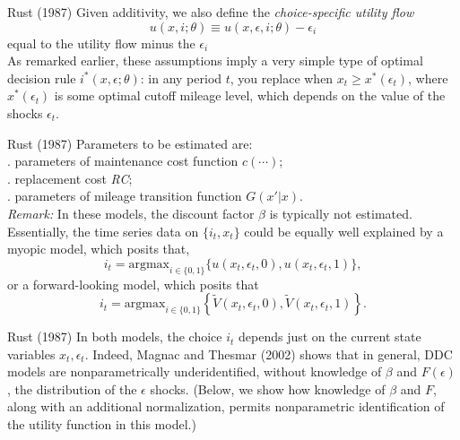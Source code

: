 \documentclass[xcolor=pdftex,dvipsnames,table,mathserif]{beamer}
\begin{document}
\begin{frame}{Rust (1987)}
Given additivity, we also define the \emph{choice-specific utility flow}
\begin{equation*}
u(x, i;\theta) \equiv u(x, \epsilon, i; \theta) - \epsilon_i
\end{equation*}
equal to the utility flow minus the $\epsilon_i$\\
\vspace{3mm}
As remarked earlier, these assumptions imply a very simple type of optimal decision rule $i^* (x, \epsilon;\theta)$: in any period $t$, you replace when $x_t \geq x^*(\epsilon_t)$, where $x^*(\epsilon_t)$ is some optimal cutoff mileage level, which depends on the value of the shocks $\epsilon_t$. 
\end{frame}

\begin{frame}{Rust (1987)}
Parameters to be estimated are: \\
\vspace{3mm}
. parameters of maintenance cost function $c(\cdots)$; \\
\vspace{2mm}
. replacement cost \emph{RC}; \\
\vspace{2mm} 
. parameters of mileage transition function $G(x' | x)$. \\
\vspace{3mm}
\emph{Remark:} In these models, the discount factor $\beta$ is typically not estimated. Essentially, the time series data on $\{ i_t, x_t \}$ could be equally well explained by a myopic model, which posits that, 
\begin{equation*}
i_t = \text{argmax}_{i \in \{ 0, 1 \} } \{ u(x_t, \epsilon_t, 0), u(x_t, \epsilon_t, 1) \},
\end{equation*}
or a forward-looking model, which posits that 
\begin{equation*}
i_t = \text{argmax}_{i \in \{ 0, 1 \} } \left \{ \tilde V (x_t, \epsilon_t, 0), \tilde V (x_t, \epsilon_t, 1) \right \}.
\end{equation*}
\end{frame}

\begin{frame}{Rust (1987)}
In both models, the choice $i_t$ depends just on the current state variables $x_t, \epsilon_t$. Indeed, Magnac and Thesmar (2002) shows that in general, DDC models are nonparametrically underidentified, without knowledge of $\beta$ and $F(\epsilon)$, the distribution of the $\epsilon$ shocks. (Below, we show how knowledge of $\beta$ and $F$, along with an additional normalization, permits nonparametric identification of the utility function in this model.) \\
\vspace{3mm}
\end{frame}
\end{document}
